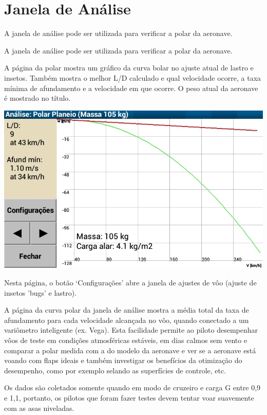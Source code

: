 \section{Janela de Análise}

A janela de análise pode ser utilizada para verificar a polar da aeronave.

A janela de análise pode ser utilizada para verificar a polar da aeronave.

A página da polar mostra um gráfico da curva bolar no ajuste atual de lastro e insetos.  Também mostra o melhor L/D calculado e qual velocidade ocorre, a taxa mínima de afundamento e a velocidade em que ocorre.  O peso atual da aeronave é mostrado no título.  


\begin{center}
\includegraphics[angle=0,width=0.8\linewidth,keepaspectratio='true']{figures/analysis-glidepolar.png}
\end{center}

Nesta página, o botão ‘Configurações’ abre a janela de ajustes de vôo (ajuste de insetos 'bugs' e lastro).

A página da curva polar da janela de análise mostra a média total da taxa de afundamento para cada velocidade alcançada no vôo, quando conectado a um variômetro inteligente (ex. Vega).  Esta facilidade permite ao piloto desempenhar vôos de teste em condições atmosféricas estáveis, em dias calmos sem vento e comparar a polar medida com a do modelo da aeronave e ver se a aeronave está voando com flaps ideais e também investigar os benefícios da otimização do desempenho, como por exemplo selando as superfícies de controle, etc.

Os dados são coletados somente quando em modo de cruzeiro e carga G entre 0,9 e 1,1, portanto, os pilotos que foram fazer testes devem tentar voar suavemente com as asas niveladas.


